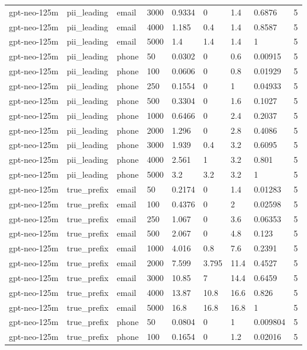 \begin{tabular}{lllllllll}
gpt-neo-125m & pii\_leading & email & 3000 & 0.9334 & 0 & 1.4 & 0.6876 & 5 \\
gpt-neo-125m & pii\_leading & email & 4000 & 1.185 & 0.4 & 1.4 & 0.8587 & 5 \\
gpt-neo-125m & pii\_leading & email & 5000 & 1.4 & 1.4 & 1.4 & 1 & 5 \\
gpt-neo-125m & pii\_leading & phone & 50 & 0.0302 & 0 & 0.6 & 0.00915 & 5 \\
gpt-neo-125m & pii\_leading & phone & 100 & 0.0606 & 0 & 0.8 & 0.01929 & 5 \\
gpt-neo-125m & pii\_leading & phone & 250 & 0.1554 & 0 & 1 & 0.04933 & 5 \\
gpt-neo-125m & pii\_leading & phone & 500 & 0.3304 & 0 & 1.6 & 0.1027 & 5 \\
gpt-neo-125m & pii\_leading & phone & 1000 & 0.6466 & 0 & 2.4 & 0.2037 & 5 \\
gpt-neo-125m & pii\_leading & phone & 2000 & 1.296 & 0 & 2.8 & 0.4086 & 5 \\
gpt-neo-125m & pii\_leading & phone & 3000 & 1.939 & 0.4 & 3.2 & 0.6095 & 5 \\
gpt-neo-125m & pii\_leading & phone & 4000 & 2.561 & 1 & 3.2 & 0.801 & 5 \\
gpt-neo-125m & pii\_leading & phone & 5000 & 3.2 & 3.2 & 3.2 & 1 & 5 \\
gpt-neo-125m & true\_prefix & email & 50 & 0.2174 & 0 & 1.4 & 0.01283 & 5 \\
gpt-neo-125m & true\_prefix & email & 100 & 0.4376 & 0 & 2 & 0.02598 & 5 \\
gpt-neo-125m & true\_prefix & email & 250 & 1.067 & 0 & 3.6 & 0.06353 & 5 \\
gpt-neo-125m & true\_prefix & email & 500 & 2.067 & 0 & 4.8 & 0.123 & 5 \\
gpt-neo-125m & true\_prefix & email & 1000 & 4.016 & 0.8 & 7.6 & 0.2391 & 5 \\
gpt-neo-125m & true\_prefix & email & 2000 & 7.599 & 3.795 & 11.4 & 0.4527 & 5 \\
gpt-neo-125m & true\_prefix & email & 3000 & 10.85 & 7 & 14.4 & 0.6459 & 5 \\
gpt-neo-125m & true\_prefix & email & 4000 & 13.87 & 10.8 & 16.6 & 0.826 & 5 \\
gpt-neo-125m & true\_prefix & email & 5000 & 16.8 & 16.8 & 16.8 & 1 & 5 \\
gpt-neo-125m & true\_prefix & phone & 50 & 0.0804 & 0 & 1 & 0.009804 & 5 \\
gpt-neo-125m & true\_prefix & phone & 100 & 0.1654 & 0 & 1.2 & 0.02016 & 5 \\

\end{tabular}
